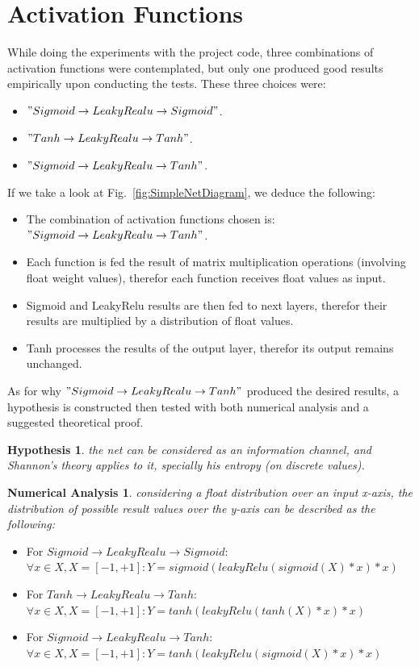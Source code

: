 \documentclass[a4paper, 12pt]{report}
\newcommand\tab[1][1cm]{\hspace*{#1}}
\newtheorem{hypothesis}{Hypothesis}
\newtheorem{numericalanalysis}{Numerical Analysis}
\begin{document}
\section{\textbf{Activation Functions}}
While doing the experiments with the project code, three combinations of activation functions were contemplated, but only one produced good results empirically upon conducting the tests. These three choices were:
\begin{itemize}[nosep]
	\item $" Sigmoid \rightarrow LeakyRealu \rightarrow Sigmoid "$.
	\item $" Tanh \rightarrow LeakyRealu \rightarrow Tanh "$.
	\item $" Sigmoid \rightarrow LeakyRealu \rightarrow Tanh "$.
\end{itemize}
If we take a look at Fig.~\ref{fig:SimpleNetDiagram}, we deduce the following:
\begin{itemize}[nosep]
	\item The combination of activation functions chosen is: $" Sigmoid \rightarrow LeakyRealu \rightarrow Tanh "$.
	\item Each function is fed the result of matrix multiplication operations (involving float weight values), therefor each function receives float values as input.
	\item Sigmoid and LeakyRelu results are then fed to next layers, therefor their results are multiplied by a distribution of float values.
	\item Tanh processes the results of the output layer, therefor its output remains unchanged.
\end{itemize}
As for why $" Sigmoid \rightarrow LeakyRealu \rightarrow Tanh "$ produced the desired results, a hypothesis is constructed then tested with both numerical analysis and a suggested theoretical proof.
\begin{hypothesis}\label{hypothesis:1}
	the net can be considered as an information channel, and Shannon's theory \citep{Shannon:2001:MTC:584091.584093} applies to it, specially his entropy (on discrete values).
\end{hypothesis}
\begin{numericalanalysis}\label{analysis:1}
	considering a float distribution over an input x-axis, the distribution of possible result values over the y-axis can be described as the following:
\end{numericalanalysis}
\begin{itemize}[nosep]
	\item For $ Sigmoid \rightarrow LeakyRealu \rightarrow Sigmoid $:\\\tab $ \forall x \in X, X = [-1, +1]: Y = sigmoid(leakyRelu(sigmoid(X)*x)*x) $
	\item For $ Tanh \rightarrow LeakyRealu \rightarrow Tanh $:\\\tab $ \forall x \in X, X = [-1, +1]: Y = tanh(leakyRelu(tanh(X)*x)*x) $
	\item For $ Sigmoid \rightarrow LeakyRealu \rightarrow Tanh $:\\\tab $ \forall x \in X, X = [-1, +1]: Y = tanh(leakyRelu(sigmoid(X)*x)*x) $
\end{itemize}
\end{document}
